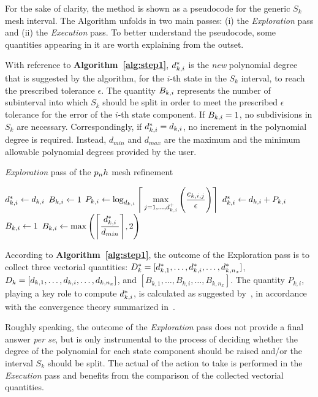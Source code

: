 For the sake of clarity, the method is shown as a pseudocode for the generic $S_k$ mesh interval. The Algorithm unfolds in two main passes: (i) the \emph{Exploration} pass and (ii) the \emph{Execution} pass.
To better understand the pseudocode, some quantities appearing in it are worth explaining from the outset.

With reference to {\bf Algorithm~\ref{alg:step1}}, $d_{k,i}^{*}$ is the \emph{new} polynomial degree that is suggested by the algorithm, for the $i$-th state in the $S_k$ interval, to reach the prescribed tolerance $\epsilon$. The quantity $B_{k,i}$ represents the number of subinterval into which $S_k$ should be split in order to meet the prescribed $\epsilon$ tolerance for the error of the $i$-th state component. If $B_{k,i} = 1$, no subdivisions in $S_k$ are necessary. Correspondingly, if $d_{k,i}^{*} = d_{k,i}$, no increment in the polynomial degree is required. Instead, $d_{min}$ and $d_{max}$ are the maximum and the minimum allowable polynomial degrees provided by the user.
\begin{algorithm}
\caption{\emph{Exploration} pass of the $p_{n}h$ mesh refinement}\label{alg:step1}
	\begin{algorithmic}[1]
				\State $d_{k,i}^{*} \gets d_{k,i}$ 
				\State $B_{k,i} \gets 1$     
			\Else
				\State $P_{k,i} \gets \log_{d_{k,i}} \Bigg\lceil \max\limits_{j= 1, \dots, d_{k,i}^{+}} \Bigg(\dfrac{e_{k,i,j}}{\epsilon}\Bigg) \Bigg\rceil$
				\State $d_{k,i}^{*} \gets d_{k,i} + P_{k,i}$
						\State $B_{k,i} \gets 1$		
					\Else
						\State $B_{k,i} \gets \max\Bigg(\Bigg\lceil \dfrac{d_{k,i}^{*}}{d_{min}}\Bigg\rceil, 2\Bigg)$
					\EndIf
			\EndIf
		\EndFor
	\end{algorithmic}
\end{algorithm}

According to {\bf Algorithm~\ref{alg:step1}}, the outcome of the Exploration pass is to collect three vectorial quantities: $D_{k}^{*} = [d_{k,1}^{*}, \dots, d_{k,i}^{*}, \dots, d_{k,n_x}^{*}]$, $D_{k} = [d_{k,1}, \dots, d_{k,i}, \dots, d_{k,n_x}]$, and $[B_{k,1}, \ldots, B_{k,i}, \ldots, B_{k,n_x}]$. The quantity $P_{k,i}$, playing a key role to compute $d_{k,i}^{*}$, is calculated as suggested by~\cite{Patterson:OCAM:2015}, in accordance with the convergence theory summarized in~\cite{Hou:GNC:2012,Hou:PHD:2013}.

Roughly speaking, the outcome of the \emph{Exploration} pass does not provide a final answer \emph{per se}, but is only instrumental to the process of deciding whether the degree of the polynomial for each state component should be raised and/or the interval $S_k$ should be split. The actual of the action to take is performed in the \emph{Execution} pass and benefits from the comparison of the collected vectorial quantities.

